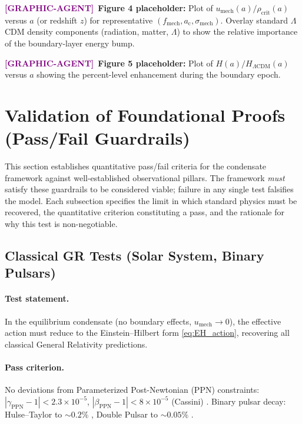 \documentclass[11pt,a4paper]{article}
\newcommand{\ac}{a_{\mathrm{c}}}
\newcommand{\sigmamech}{\sigma_{\mathrm{mech}}}
\newcommand{\fmech}{f_{\mathrm{mech}}}
\newcommand{\umech}{u_{\mathrm{mech}}}
\newcommand{\rhocrit}{\rho_{\mathrm{crit}}}
\theoremstyle{definition}
\newcommand{\GRAPHAGENT}{\textcolor{purple}{\textbf{[GRAPHIC-AGENT]}}}
\begin{document}
\GRAPHAGENT~\textbf{Figure 4 placeholder:} Plot of $\umech(a)/\rhocrit(a)$ versus $a$ (or redshift $z$) for representative $(\fmech, \ac, \sigmamech)$. Overlay standard $\Lambda$CDM density components (radiation, matter, $\Lambda$) to show the relative importance of the boundary-layer energy bump.

\GRAPHAGENT~\textbf{Figure 5 placeholder:} Plot of $H(a)/H_{\Lambda\mathrm{CDM}}(a)$ versus $a$ showing the percent-level enhancement during the boundary epoch.

\section{Validation of Foundational Proofs (Pass/Fail Guardrails)}
\label{sec:validation}

This section establishes quantitative pass/fail criteria for the condensate framework against well-established observational pillars. The framework \emph{must} satisfy these guardrails to be considered viable; failure in any single test falsifies the model. Each subsection specifies the limit in which standard physics must be recovered, the quantitative criterion constituting a pass, and the rationale for why this test is non-negotiable.

\subsection{Classical GR Tests (Solar System, Binary Pulsars)}
\label{sec:GR_tests}

\paragraph{Test statement.}
In the equilibrium condensate (no boundary effects, $\umech \to 0$), the effective action must reduce to the Einstein--Hilbert form \eqref{eq:EH_action}, recovering all classical General Relativity predictions.

\paragraph{Pass criterion.}
No deviations from Parameterized Post-Newtonian (PPN) constraints: $|\gamma_{\mathrm{PPN}} - 1| < 2.3 \times 10^{-5}$, $|\beta_{\mathrm{PPN}} - 1| < 8 \times 10^{-5}$ (Cassini) \cite{PPN_Cassini}. Binary pulsar decay: Hulse--Taylor to $\sim 0.2\%$ \cite{HulseTaylor}, Double Pulsar to $\sim 0.05\%$ \cite{DoublePulsar}.
\end{document}
